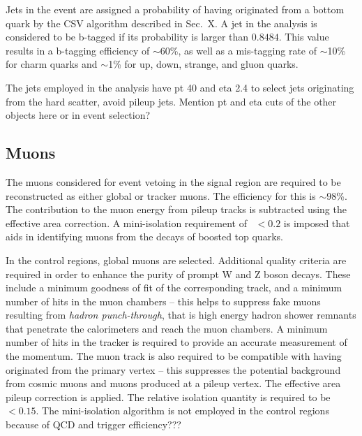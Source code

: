 Jets in the event are assigned a probability of having originated from a bottom 
quark by the CSV algorithm described in Sec.~X. A jet in the analysis is 
considered to be b-tagged if its probability is larger than $0.8484$. This 
value 
results in a b-tagging efficiency of $\sim$60\%, as well as a mis-tagging rate 
of $\sim$10\% for charm quarks and $\sim$1\% for up, down, strange, and gluon 
quarks.

The jets employed in the analysis have pt 40 and eta 2.4 to select jets 
originating from the hard scatter, avoid pileup jets. Mention pt and eta cuts 
of the other objects here or in event selection?

\subsection*{Muons}

The muons considered for event vetoing in the signal region are required to be 
reconstructed as either global or tracker muons. The efficiency for this is 
$\sim98$\%. The contribution to the muon energy from pileup tracks is 
subtracted using the effective area correction. A mini-isolation requirement of 
\miniiso~$ < 0.2$ is imposed that aids in identifying muons from the decays of 
boosted top quarks.

In the control regions, global muons are selected. Additional quality criteria 
are required in order to enhance the purity of prompt W and Z boson decays. 
These include a minimum goodness of fit of the corresponding track, and a 
minimum number of hits in the muon chambers -- this helps to suppress fake 
muons resulting from \textit{hadron punch-through}, that is high energy hadron 
shower remnants that penetrate the calorimeters and reach the muon chambers. A 
minimum number of hits in the 
tracker is required to provide an accurate measurement of the momentum. The 
muon track is also required to be compatible with having originated from the 
primary vertex -- this suppresses the potential background from cosmic muons 
and muons produced at a pileup vertex. The effective area pileup correction is 
applied. The relative isolation quantity is required to be \reliso~$ < 0.15$. 
The mini-isolation algorithm is not employed in the control regions because of 
QCD and trigger efficiency???

